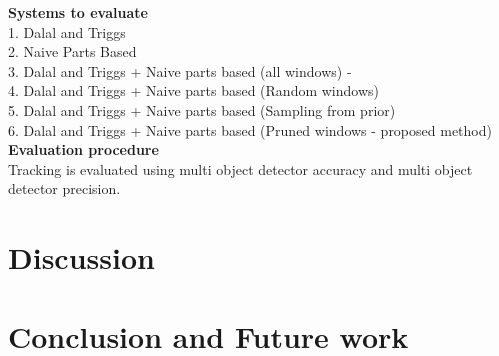 \documentclass[10pt,twocolumn,letterpaper]{article}
\begin{document}
\textbf{Systems to evaluate}\\
1. Dalal and Triggs\\ 
2. Naive Parts Based\\ 
3. Dalal and Triggs + Naive parts based (all windows) - \\
4. Dalal and Triggs + Naive parts based (Random windows)\\
5. Dalal and Triggs + Naive parts based (Sampling from prior)\\
6. Dalal and Triggs + Naive parts based (Pruned windows - proposed method)\\
 

\textbf{Evaluation procedure}\\
Tracking is evaluated using multi object detector accuracy and multi object detector precision.

\section{Discussion}


\section{Conclusion and Future work}
{\small


}
\end{document}
